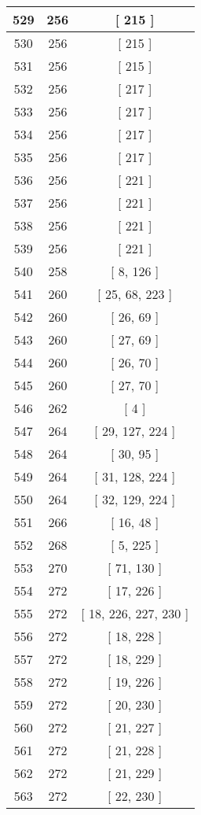 \begin{center}
\begin{longtable}[H]{|| c c c ||}
\hline
529 & 256 & [ 215 ] \\ 
\hline
530 & 256 & [ 215 ] \\ 
\hline
531 & 256 & [ 215 ] \\ 
\hline
532 & 256 & [ 217 ] \\ 
\hline
533 & 256 & [ 217 ] \\ 
\hline
534 & 256 & [ 217 ] \\ 
\hline
535 & 256 & [ 217 ] \\ 
\hline
536 & 256 & [ 221 ] \\ 
\hline
537 & 256 & [ 221 ] \\ 
\hline
538 & 256 & [ 221 ] \\ 
\hline
539 & 256 & [ 221 ] \\ 
\hline
540 & 258 & [ 8, 126 ] \\ 
\hline
541 & 260 & [ 25, 68, 223 ] \\ 
\hline
542 & 260 & [ 26, 69 ] \\ 
\hline
543 & 260 & [ 27, 69 ] \\ 
\hline
544 & 260 & [ 26, 70 ] \\ 
\hline
545 & 260 & [ 27, 70 ] \\ 
\hline
546 & 262 & [ 4 ] \\ 
\hline
547 & 264 & [ 29, 127, 224 ] \\ 
\hline
548 & 264 & [ 30, 95 ] \\ 
\hline
549 & 264 & [ 31, 128, 224 ] \\ 
\hline
550 & 264 & [ 32, 129, 224 ] \\ 
\hline
551 & 266 & [ 16, 48 ] \\ 
\hline
552 & 268 & [ 5, 225 ] \\ 
\hline
553 & 270 & [ 71, 130 ] \\ 
\hline
554 & 272 & [ 17, 226 ] \\ 
\hline
555 & 272 & [ 18, 226, 227, 230 ] \\ 
\hline
556 & 272 & [ 18, 228 ] \\ 
\hline
557 & 272 & [ 18, 229 ] \\ 
\hline
558 & 272 & [ 19, 226 ] \\ 
\hline
559 & 272 & [ 20, 230 ] \\ 
\hline
560 & 272 & [ 21, 227 ] \\ 
\hline
561 & 272 & [ 21, 228 ] \\ 
\hline
562 & 272 & [ 21, 229 ] \\ 
\hline
563 & 272 & [ 22, 230 ] \\ 
\hline

\end{longtable}
\end{center}
